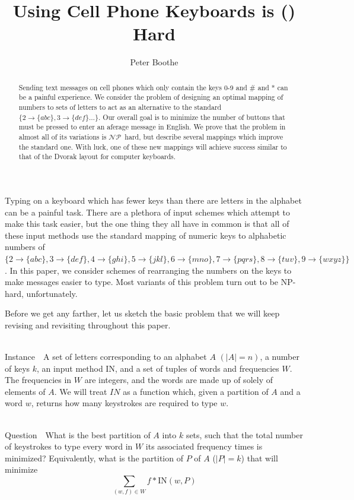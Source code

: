 \documentclass[runningheads]{llncs}
\title{Using Cell Phone Keyboards is (\NP) Hard}
\author{Peter Boothe}
\institute{Manhattan College\\
\email{peter.boothe@manhattan.edu}
}
\newcommand{\NP}{\ensuremath{\mathcal{NP}}}
\newcommand{\Instance}{{\sc Instance~}}
\newcommand{\Question}{~\\
{\sc Question~}}
\begin{document}
\maketitle

\begin{abstract}
Sending text messages on cell phones which only contain the keys 0-9 and \# and
* can be a painful experience.  We consider the problem of designing an optimal
mapping of numbers to sets of letters to act as an alternative to the standard
$\{2\to\{abc\}, 3\to\{def\}\ldots\}$.  Our overall goal is to minimize the
number of buttons that must be pressed to enter an aferage message in English.
We prove that the problem in almost all of its variations is \NP\ hard, but
describe several mappings which improve the standard one.  With luck, one of
these new mappings will achieve success similar to that of the Dvorak layout
for computer keyboards.
\end{abstract}

Typing on a keyboard which has fewer keys than there are letters in the
alphabet can be a painful task.  There are a plethora of input schemes which
attempt to make this task easier, but the one thing they all have in common is
that all of these input methods use the standard mapping of numeric keys to
alphabetic numbers of 
$\{2\to\{abc\},
         3\to\{def\}, 4\to\{ghi\}, 5\to\{jkl\}, 6\to\{mno\}, 7\to\{pqrs\},
         8\to\{tuv\}, 9\to\{wxyz\}\}$.
In this paper, we consider schemes of rearranging the numbers on the keys to
make messages easier to type.  Most variants of this problem turn out to be
NP-hard, unfortunately.

Before we get any farther, let us sketch the basic problem that we will keep
revising and revisiting throughout this paper.
\begin{prob}[{\sc MinimumKeystrokes}]~\\
\Instance\ A set of letters corresponding to an alphabet $A$ $(|A| =
n)$, a number of keys $k$, an input method $\mathrm{IN}$, and a set of
tuples of words and frequencies $W$.  The frequencies in $W$ are integers,
and the words are made up of solely of elements of $A$.  We will
treat $IN$ as a function which, given a partition of $A$ and a word
$w$, returns how many keystrokes are required to type $w$.

\Question\ What is the best partition of $A$ into $k$ sets, such that the
total number of keystrokes to type every word in $W$ its associated frequency
times is minimized?  Equivalently, what is the partition of $P$ of $A$ ($|P| = k$) that
will minimize
$$\sum_{(w,f)\in W} f*\mathrm{IN}(w,P)$$
\label{probtemplate}
\end{prob}
\end{document}
